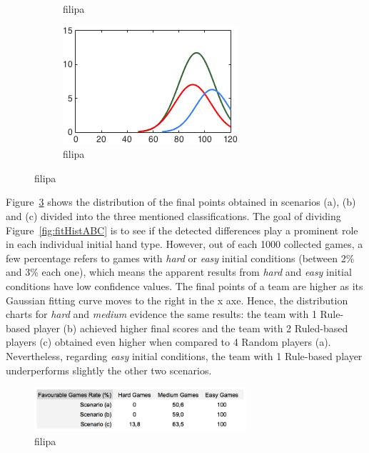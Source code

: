 \begin{figure}[h]
\begin{subfigure}[h]{0.32\textwidth}
                \caption{filipa}
                \label{fig:ABC-Hmedium}
        \end{subfigure}
        \begin{subfigure}[h]{0.32\textwidth}
                \includegraphics[width=\textwidth]{./img/5/ABCeasy}
                \caption{filipa}
                \label{fig:ABC-Heasy}
        \end{subfigure}
        \caption{filipa}
        \label{fig:ABC-CH}
\end{figure}

Figure~\ref{fig:ABC-CH} shows the distribution of the final points obtained in scenarios (a), (b) and (c) divided into the three mentioned classifications.
The goal of dividing Figure~\ref{fig:fitHistABC} is to see if the detected differences play a prominent role in each individual initial hand type.
However, out of each 1000 collected games, a few percentage refers to games with \emph{hard} or \emph{easy} initial conditions (between 2\% and 3\% each one), which means the apparent results from \emph{hard} and \emph{easy} initial conditions have low confidence values.
The final points of a team are higher as its Gaussian fitting curve moves to the right in the x axe.
Hence, the distribution charts for \emph{hard} and \emph{medium} evidence the same results: the team with 1 Rule-based player (b) achieved higher final scores and the team with 2 Ruled-based players (c) obtained even higher when compared to 4 Random players (a).
Nevertheless, regarding \emph{easy} initial conditions, the team with 1 Rule-based player underperforms slightly the other two scenarios.

\begin{figure}[h!]
  \centering
    \includegraphics[width=0.7\textwidth]{./img/5/ABC-fgr}
  \caption{filipa}
\label{fig:ABC-fgr}
\end{figure}

